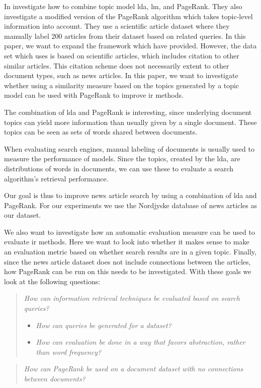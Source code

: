 In \cite{yang2009topic} \citeauthor{yang2009topic} investigate how to combine topic model \gls{lda}, \gls{lm}, and PageRank.
They also investigate a modified version of the PageRank algorithm which takes topic-level information into account.
They use a scientific article dataset where they manually label 200 articles from their dataset based on related queries. 
In this paper, we want to expand the framework which \cite{yang2009topic} have provided.
However, the data set which \cite{yang2009topic} uses is based on scientific articles, which includes citation to other similar articles.
This citation scheme does not necessarily extent to other document types, such as news articles.
In this paper, we want to investigate whether using a similarity measure based on the topics generated by a topic model can be used with PageRank to improve \gls{ir} methods.

The combination of \gls{lda} and PageRank is interesting, since underlying document topics can yield more information than usually given by a single document.
These topics can be seen as sets of words shared between documents. 

When evaluating search engines, manual labeling of documents is usually used to measure the performance of models\cite{yang2009topic}\cite{Tang2008}.
Since the topics, created by the \gls{lda}, are distributions of words in documents, we can use these to evaluate a search algorithm's retrieval performance. 

Our goal is thus to improve news article search by using a combination of \gls{lda} and PageRank.
For our experiments we use the Nordjyske database of news articles as our dataset.

We also want to investigate how an automatic evaluation measure can be used to evaluate \gls{ir} methods.
Here we want to look into whether it makes sense to make an evaluation metric based on whether search results are in a given topic.
Finally, since the news article dataset does not include connections between the articles, how PageRank can be run on this needs to be investigated.
With these goals we look at the following questions:

\begin{quote}
	\emph{How can information retrieval techniques be evaluated based on search queries?}
	\begin{itemize}
		\item \emph{How can queries be generated for a dataset?}
		\item \emph{How can evaluation be done in a way that favors abstraction, rather than word frequency?}
	\end{itemize}
\end{quote}
\vspace{0.1 cm}

\begin{quote}
	\emph{How can PageRank be used on a document dataset with no connections between documents?}
\end{quote}




